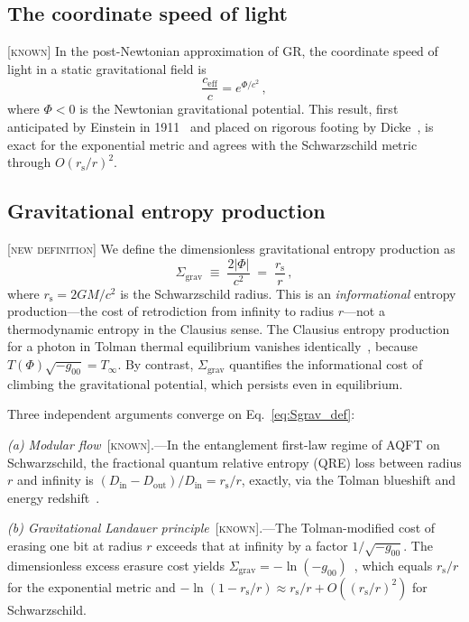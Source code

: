 \documentclass[prl,twocolumn,superscriptaddress,longbibliography,floatfix]{revtex4-2}
\newcommand{\ceff}{c_{\mathrm{eff}}}
\newcommand{\rs}{r_{\mathrm{s}}}
\newcommand{\Sgrav}{\Sigma_{\mathrm{grav}}}
\begin{document}
\subsection{The coordinate speed of light}

[\textsc{known}]  In the post-Newtonian approximation of GR,
the coordinate speed of light in a static gravitational field
is~\cite{Einstein1911,Dicke1957}
\begin{equation}
  \frac{\ceff}{c} = e^{\Phi/c^2}\,,
  \label{eq:ceff}
\end{equation}
where $\Phi < 0$ is the Newtonian gravitational potential.
This result, first anticipated by Einstein in
1911~\cite{Einstein1911} and placed on rigorous footing by
Dicke~\cite{Dicke1957}, is exact for the exponential
metric and agrees with the Schwarzschild metric through
$O(\rs/r)^2$.

\subsection{Gravitational entropy production}

[\textsc{new definition}]  We define the dimensionless
gravitational entropy production as
\begin{equation}
  \boxed{\;\Sgrav \;\equiv\; \frac{2|\Phi|}{c^2}
  \;=\; \frac{\rs}{r}\,,\;}
  \label{eq:Sgrav_def}
\end{equation}
where $\rs = 2GM/c^2$ is the Schwarzschild radius.
This is an \emph{informational} entropy production---the cost
of retrodiction from infinity to radius $r$---not a
thermodynamic entropy in the Clausius sense.
The Clausius entropy production for a photon in Tolman thermal
equilibrium vanishes identically~\cite{Tolman1930}, because
$T(\Phi)\sqrt{-g_{00}} = T_\infty$.
By contrast, $\Sgrav$ quantifies the informational cost of
climbing the gravitational potential, which persists even in
equilibrium.

Three independent arguments converge on
Eq.~\eqref{eq:Sgrav_def}:

\emph{(a) Modular flow}~[\textsc{known}].---In the
entanglement first-law regime of AQFT on Schwarzschild, the
fractional quantum relative entropy (QRE) loss between radius
$r$ and infinity is $(D_{\mathrm{in}} - D_{\mathrm{out}})/
D_{\mathrm{in}} = \rs/r$, exactly, via the Tolman blueshift
and energy redshift~\cite{DorauMuch2025}.

\emph{(b) Gravitational Landauer principle}~[\textsc{known}].---The
Tolman-modified cost of erasing one bit at radius $r$ exceeds
that at infinity by a factor $1/\sqrt{-g_{00}}$.
The dimensionless excess erasure cost yields
$\Sgrav = -\ln(-g_{00})$~\cite{Herrera2020}, which equals
$\rs/r$ for the exponential metric and
$-\ln(1 - \rs/r) \approx \rs/r + O((\rs/r)^2)$ for
Schwarzschild.
\end{document}
